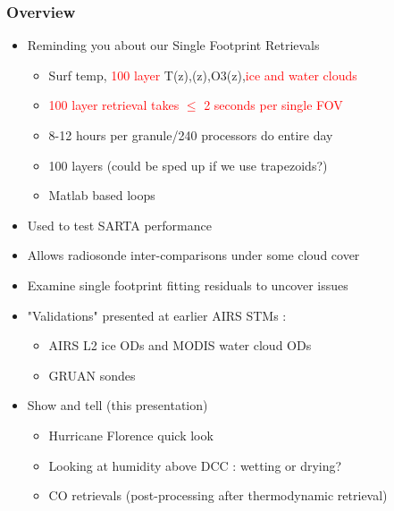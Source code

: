 \documentclass[10pt,t]{beamer}
\begin{document}
\begin{frame}
  \frametitle{Overview}

  \begin{itemize}
  \item Reminding you about our Single Footprint Retrievals
    \begin{itemize}
    \item Surf temp, \textcolor{red}{100 layer}
      T(z),\water(z),O3(z),\textcolor{red}{ice and water clouds}    
    \item \textcolor{red}{100 layer retrieval takes $\le$ 2 seconds per
        single FOV}    
    \item 8-12 hours per granule/240 processors do entire day
    \item 100 layers (could be sped up if we use trapezoids?)
    \item Matlab based loops 
    \end{itemize}
  \item Used to test SARTA performance
  \item Allows radiosonde inter-comparisons under some cloud cover
  \item Examine single footprint fitting residuals to uncover issues
  \item "Validations" presented at earlier AIRS STMs : 
    \begin{itemize}
    \item AIRS L2 ice ODs and MODIS water cloud ODs
    \item GRUAN sondes
    \end{itemize}
  \item Show and tell (this presentation)
    \begin{itemize}
    \item Hurricane Florence quick look
    \item Looking at humidity above DCC : wetting or drying?    
    \item CO retrievals (post-processing after thermodynamic retrieval)
    \end{itemize}
  \end{itemize}
\end{frame}
\end{document}
